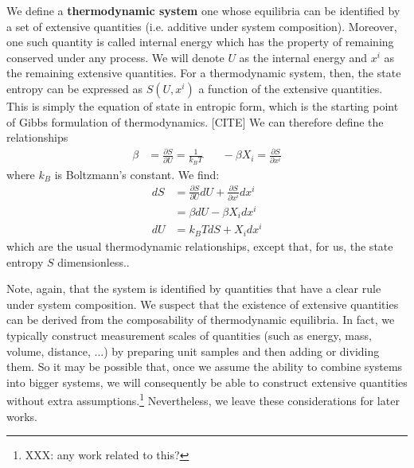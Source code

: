 \documentclass[letterpaper,twocolumn]{article}
\begin{document}
We define a \textbf{thermodynamic system} one whose equilibria can be identified by a set of extensive quantities (i.e. additive under system composition). Moreover, one such quantity is called internal energy which has the property of remaining conserved under any process. We will denote $U$ as the internal energy and $x^i$ as the remaining extensive quantities. For a thermodynamic system, then, the state entropy can be expressed as $S(U, x^i)$ a function of the extensive quantities. This is simply the equation of state in entropic form, which is the starting point of Gibbs formulation of thermodynamics. [CITE] We can therefore define the relationships
\begin{align}
	\beta &= \frac{\partial S}{\partial U} = \frac{1}{k_B T} \;\;\;\;\;\; - \beta X_i = \frac{\partial S}{\partial x^i}
\end{align}
where $k_B$ is Boltzmann's constant. We find:
\begin{align}
dS &= \frac{\partial S}{\partial U} dU + \frac{\partial S}{\partial x^i} dx^i \\
&= \beta dU - \beta X_i dx^i \\
dU &= k_B T dS + X_i dx^i
\end{align}
which are the usual thermodynamic relationships, except that, for us, the state entropy $S$ dimensionless..

Note, again, that the system is identified by quantities that have a clear rule under system composition. We suspect that the existence of extensive quantities can be derived from the composability of thermodynamic equilibria. In fact, we typically construct measurement scales of quantities (such as energy, mass, volume, distance, ...) by preparing unit samples and then adding or dividing them. So it may be possible that, once we assume the ability to combine systems into bigger systems, we will consequently be able to construct extensive quantities without extra assumptions.\footnote{XXX: any work related to this?} Nevertheless, we leave these considerations for later works.
\end{document}
